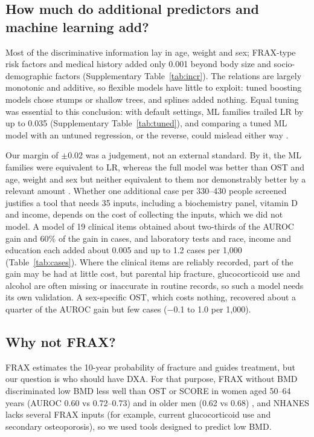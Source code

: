 \documentclass[11pt,a4paper]{article}
\begin{document}
\subsection{How much do additional predictors and machine learning add?}
Most of the discriminative information lay in age, weight and sex; FRAX-type risk factors and medical history added only 0.001 beyond body size and socio-demographic factors (Supplementary Table~\ref{tab:incr}). The relations are largely monotonic and additive, so flexible models have little to exploit: tuned boosting models chose stumps or shallow trees, and splines added nothing. Equal tuning was essential to this conclusion: with default settings, ML families trailed LR by up to 0.035 (Supplementary Table~\ref{tab:tuned}), and comparing a tuned ML model with an untuned regression, or the reverse, could mislead either way \cite{christodoulou2019}.

Our margin of $\pm$0.02 was a judgement, not an external standard. By it, the ML families were equivalent to LR, whereas the full model was better than OST and age, weight and sex but neither equivalent to them nor demonstrably better by a relevant amount \cite{dehond2022}. Whether one additional case per 330--430 people screened justifies a tool that needs 35 inputs, including a biochemistry panel, vitamin D and income, depends on the cost of collecting the inputs, which we did not model. A model of 19 clinical items obtained about two-thirds of the AUROC gain and 60\% of the gain in cases, and laboratory tests and race, income and education each added about 0.005 and up to 1.2 cases per 1,000 (Table~\ref{tab:cases}). Where the clinical items are reliably recorded, part of the gain may be had at little cost, but parental hip fracture, glucocorticoid use and alcohol are often missing or inaccurate in routine records, so such a model needs its own validation. A sex-specific OST, which costs nothing, recovered about a quarter of the AUROC gain but few cases ($-$0.1 to 1.0 per 1,000).

\subsection{Why not FRAX?}
FRAX estimates the 10-year probability of fracture \cite{kanis2008} and guides treatment, but our question is who should have DXA. For that purpose, FRAX without BMD discriminated low BMD less well than OST or SCORE in women aged 50--64 years (AUROC 0.60 vs 0.72--0.73) \cite{crandall2014} and in older men (0.62 vs 0.68) \cite{diem2017}, and NHANES lacks several FRAX inputs (for example, current glucocorticoid use and secondary osteoporosis), so we used tools designed to predict low BMD.
\end{document}
